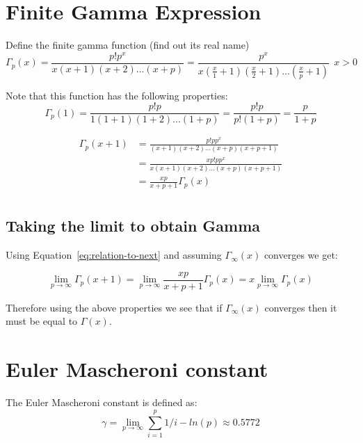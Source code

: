 \documentclass[a4paper]{article}
\begin{document}
    \section{Finite Gamma Expression}\label{sec:finite-gamma-expression}
    Define the finite gamma function (find out its real name)
    \begin{equation}
        \label{eq:finite-gamma-def}
        \Gamma_{p}(x) = \frac{p! p^x}{x (x+ 1)(x + 2)...(x + p)} = \frac{p^x}{x (\frac{x}{1} + 1)(\frac{x}{2} + 1)...(\frac{x}{p} + 1)}
        \ \ x>0
    \end{equation}

    Note that this function has the following properties:
    \begin{equation}
        \Gamma_{p}(1) = \frac{p! p}{1 (1 + 1)(1+2)...(1+p)} = \frac{p! p}{p! (1+p)} = \frac{p}{1+p}\label{eq:equation5}
    \end{equation}

    \begin{equation}
        \label{eq:relation-to-next}
        \begin{split}
            \Gamma_{p}(x+1) &= \frac{p! p p^x}{(x + 1)(x+2)...(x+p)(x+p+1)} \\
            &= \frac{x p! p p^x}{x(x + 1)(x+2)...(x+p)(x+p+1)} \\
            &= \frac{x p}{x+p+1} \Gamma_{p}(x) \\
        \end{split}
    \end{equation}

    \subsection{Taking the limit to obtain Gamma}\label{subsec:taking-the-limit-to-obtain-gamma}

    Using Equation~\ref{eq:relation-to-next} and assuming $\Gamma_{\infty}(x)$ converges we get:

    \begin{equation}
        \lim_{p \to \infty} \Gamma_{p}(x+1) =
        \lim_{p \to \infty} \frac{x p}{x+p+1} \Gamma_{p}(x) = x \lim_{p \to \infty} \Gamma_{p}(x)\label{eq:equation6}
    \end{equation}

    Therefore using the above properties we see that if $\Gamma_{\infty}(x)$ converges then it must be equal to $\Gamma(x)$.


    \section{Euler Mascheroni constant}\label{sec:euler-const}
    The Euler Mascheroni constant is defined as:
    \begin{equation}
        \label{eq:euler_mascheroni_def}
        \gamma = \lim_{p \to \infty} \sum_{i=1}^{p} 1/i - ln(p) \approx 0.5772
    \end{equation}
\end{document}
